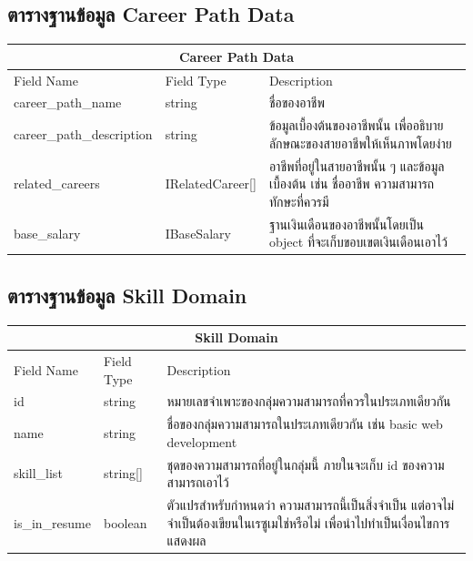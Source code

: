 \subsection{ตารางฐานข้อมูล Career Path Data}
\begin{table}[H]
    \begin{tabular*}{\textwidth}{l|l|p{}}
        \hline
        \multicolumn{3}{c}{Career Path Data}                                                                      \\\hline
        Field Name  & Field Type     & Description                                                       \\\hline
        career\_path\_name             & string         & ชื่อของอาชีพ                                                      \\
        career\_path\_description      & string         & ข้อมูลเบื้องต้นของอาชีพนั้น เพื่ออธิบายลักษณะของสายอาชีพให้เห็นภาพโดยง่าย \\
        related\_careers              & IRelatedCareer{[}{]} &   อาชีพที่อยู่ในสายอาชีพนั้น ๆ และข้อมูลเบื้องต้น เช่น ชื่ออาชีพ ความสามารถ ทักษะที่ควรมี \\
        base\_salary                   & IBaseSalary & ฐานเงินเดือนของอาชีพนั้นโดยเป็น object ที่จะเก็บขอบเขตเงินเดือนเอาไว้ \\ \hline
    \end{tabular*}
\end{table}

\subsection{ตารางฐานข้อมูล Skill Domain}
\begin{table}[H]
    \begin{tabular*}{\textwidth}{l|l|p{}}
        \hline
        \multicolumn{3}{c}{Skill Domain}                              \\\hline
        Field Name    & Field Type & Description                  \\\hline
        id    & string     & หมายเลขจำเพาะของกลุ่มความสามารถที่ควรในประเภทเดียวกัน       \\
        name & string     & ชื่อของกลุ่มความสามารถในประเภทเดียวกัน เช่น basic web development \\
        skill\_list    & string[]     & ชุดของความสามารถที่อยู่ในกลุ่มนี้ ภายในจะเก็บ id ของความสามารถเอาไว้       \\
        is\_in\_resume & boolean     & ตัวแปรสำหรับกำหนดว่า ความสามารถนี้เป็นสิ่งจำเป็น แต่อาจไม่จำเป็นต้องเขียนในเรซูเมใช่หรือไม่ เพื่อนำไปทำเป็นเงื่อนไขการแสดงผล \\\hline
    \end{tabular*}
\end{table}

